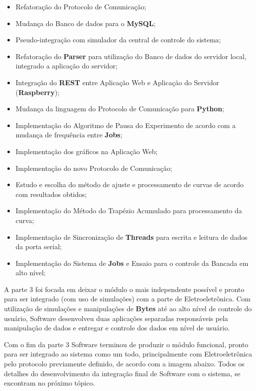 \begin{itemize}
  \item Refatoração do Protocolo de Comunicação;
  \item Mudança do Banco de dados para o \textbf{MySQL};
  \item Pseudo-integração com simulador da central de controle do sistema;
  \item Refatoração do \textbf{Parser} para utilização do Banco de dados do servidor local, integrado a aplicação do servidor;
  \item Integração do \textbf{REST} entre Aplicação Web e Aplicação do Servidor (\textbf{Raspberry});
  \item Mudança da linguagem do Protocolo de Comunicação para \textbf{Python};
  \item Implementação do Algoritmo de Pausa do Experimento de acordo com a mudança de frequência entre \textbf{Jobs};
  \item Implementação dos gráficos na Aplicação Web;
  \item Implementação do novo Protocolo de Comunicação;
  \item Estudo e escolha do método de ajuste e processamento de curvas de acordo com resultados obtidos;
  \item Implementação do Método do Trapézio Acumulado para processamento da curva;
  \item Implementação de Sincronização de \textbf{Threads} para escrita e leitura de dados da porta serial;
  \item Implementação do Sistema de \textbf{Jobs} e Ensaio para o controle da Bancada em alto nível;
\end{itemize}

A parte 3 foi focada em deixar o módulo o mais independente possível e pronto para ser integrado (com uso de simulações) com a parte de Eletroeletrônica. Com utilização de simulações e manipulações de \textbf{Bytes} até ao alto nível de controle do usuário, Software desenvolveu duas aplicações separadas responsáveis pela manipulação de dados e entregar e controle dos dados em nível de usuário.

Com o fim da parte 3 Software terminou de produzir o módulo funcional, pronto para ser integrado ao sistema como um todo, principalmente com Eletroeletrônica pelo protocolo previamente definido, de acordo com a imagem abaixo. Todos os detalhes do desenvolvimento da integração final de Software com o sistema, se encontram no próximo tópico.

